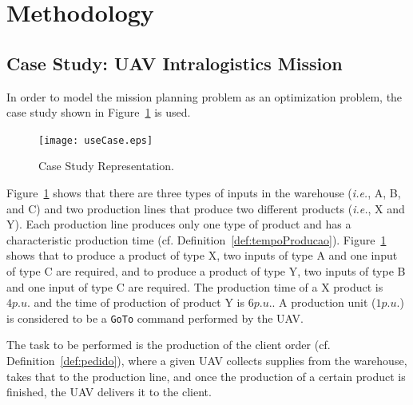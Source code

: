 \documentclass[12pt]{article}
\begin{document}


\section{Methodology}
\label{sec:method}



\subsection{Case Study: UAV Intralogistics Mission}
\label{sec:ec}

In order to model the mission planning problem as an optimization problem, the case study shown in Figure~\ref{fig:useCase} is used.
%
\begin{figure}[ht]
	\centering
	\texttt{[image: useCase.eps]}
	\caption{Case Study Representation.\label{fig:useCase}}
\end{figure}
	
Figure~\ref{fig:useCase} shows that there are three types of inputs in the warehouse (\textit{i.e.}, A, B, and C) and two production lines that produce two different products (\textit{i.e.}, X and Y). Each production line produces only one type of product and has a characteristic production time (cf. Definition~\ref{def:tempoProducao}). Figure~\ref{fig:useCase} shows that to produce a product of type X, two inputs of type A and one input of type C are required, and to produce a product of type Y, two inputs of type B and one input of type C are required. The production time of a X product is $4 p.u.$ and the time of production of product Y is $6 p.u.$. A production unit ($1 p.u.$) is considered to be a \texttt{GoTo} command performed by the UAV.

The task to be performed is the production of the client order (cf. Definition~\ref{def:pedido}), where a given UAV collects supplies from the warehouse, takes that to the production line, and once the production of a certain product is finished, the UAV delivers it to the client.
\end{document}
